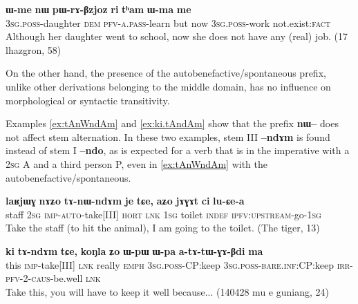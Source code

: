 \documentclass[oldfontcommands,oneside,a4paper,11pt]{article}
\newcommand{\ipa}[1]{\textbf{{\phon\mbox{#1}}}} %
\begin{document}
 \begin{exe}
\ex \label{ex:pWrABzjoz}
\gll 
\ipa{ɯ-me} 	\ipa{nɯ} 	\ipa{pɯ-rɤ-βzjoz} 	\ipa{ri} 	\ipa{tʰam} 	\ipa{ɯ-ma} 	\ipa{me} \\
\textsc{3sg.poss}-daughter \textsc{dem} \textsc{pfv-a.pass}-learn but now \textsc{3sg.poss}-work not.exist:\textsc{fact} \\
\glt Although her daughter went to school, now she does not have any (real) job. (17 lhazgron, 58)
\end{exe}

On the other hand, the presence of the autobenefactive/spontaneous prefix, unlike other derivations belonging to the middle domain, has no influence on  morphological or syntactic transitivity. 
 
 Examples \ref{ex:tAnWndAm} and \ref{ex:ki.tAndAm} show that the prefix \ipa{nɯ--} does not affect stem alternation. In these two examples, stem III   \ipa{--ndɤm} is found instead of stem I \ipa{--ndo}, as is expected for a verb that is in the imperative with a \textsc{2sg} A and a third person P, even in \ref{ex:tAnWndAm} with the autobenefactive/spontaneous.
 

 \begin{exe}
\ex \label{ex:tAnWndAm}
\gll
\ipa{laʁjɯɣ} 	\ipa{nɤʑo} 	\ipa{tɤ-nɯ-ndɤm} 	\ipa{je} 	\ipa{tɕe,} 	\ipa{aʑo} 	\ipa{jɤɣɤt} 	\ipa{ci} 	\ipa{lu-ɕe-a} 	\\
staff \textsc{2sg} \textsc{imp-auto}-take[III] \textsc{hort} \textsc{lnk} \textsc{1sg} toilet \textsc{indef} \textsc{ipfv:upstream}-go-\textsc{1sg} \\
\glt Take the staff (to hit the animal), I am going to the toilet. (The tiger, 13) 
\end{exe}

 \begin{exe}
\ex \label{ex:ki.tAndAm}
\gll
\ipa{ki}  	\ipa{tɤ-ndɤm}  	\ipa{tɕe,}  	\ipa{koŋla}  	\ipa{ʑo}   \ipa{ɯ-pɯ}  	\ipa{ɯ-pa}  	\ipa{a-tɤ-tɯ-ɣɤ-βdi}  	\ipa{ma}  \\
this \textsc{imp}-take[III] \textsc{lnk} really \textsc{emph} \textsc{3sg.poss}-CP:keep \textsc{3sg.poss}-\textsc{bare.inf}:CP:keep \textsc{irr-pfv-2-caus}-be.well \textsc{lnk} \\
\glt Take this, you will have to keep it well because... (140428 mu e guniang, 24)
\end{exe}
\end{document}

